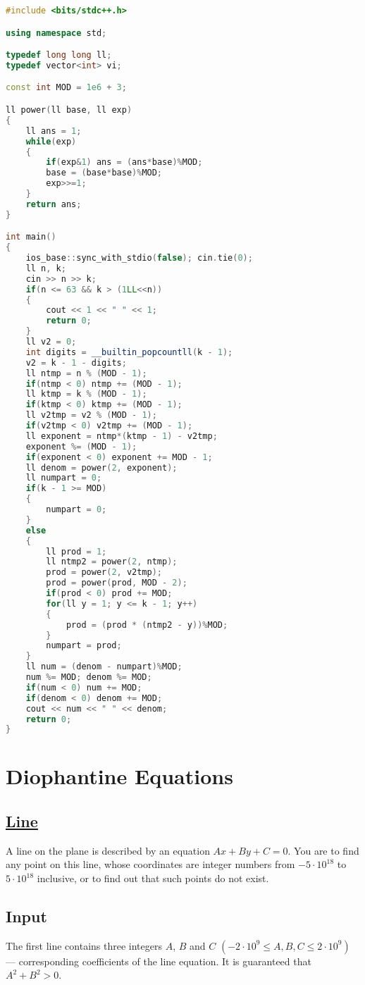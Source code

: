 \documentclass[10pt,a4paper]{article}
\begin{document}
\begin{lstlisting}[language=C++, caption={Zeus and The Birthday Paradox},label={1st:code}, mathescape=true, breaklines=true]
#include <bits/stdc++.h>

using namespace std;

typedef long long ll;
typedef vector<int> vi;

const int MOD = 1e6 + 3;

ll power(ll base, ll exp)
{
	ll ans = 1;
    while(exp)
    {
		if(exp&1) ans = (ans*base)%MOD;
		base = (base*base)%MOD;
		exp>>=1;
	}
    return ans;
}

int main()
{
	ios_base::sync_with_stdio(false); cin.tie(0);
	ll n, k;
	cin >> n >> k;
	if(n <= 63 && k > (1LL<<n))
	{
		cout << 1 << " " << 1;
		return 0;
	}
	ll v2 = 0;
	int digits = __builtin_popcountll(k - 1);
	v2 = k - 1 - digits;
	ll ntmp = n % (MOD - 1);
	if(ntmp < 0) ntmp += (MOD - 1);
	ll ktmp = k % (MOD - 1);
	if(ktmp < 0) ktmp += (MOD - 1);
	ll v2tmp = v2 % (MOD - 1);
	if(v2tmp < 0) v2tmp += (MOD - 1);
	ll exponent = ntmp*(ktmp - 1) - v2tmp;
	exponent %= (MOD - 1);
	if(exponent < 0) exponent += MOD - 1;
	ll denom = power(2, exponent);
	ll numpart = 0;
	if(k - 1 >= MOD)
	{
		numpart = 0;
	}
	else
	{
		ll prod = 1;
		ll ntmp2 = power(2, ntmp);
		prod = power(2, v2tmp);
		prod = power(prod, MOD - 2);
		if(prod < 0) prod += MOD;
		for(ll y = 1; y <= k - 1; y++)
		{
			prod = (prod * (ntmp2 - y))%MOD;
		}
		numpart = prod;
	}
	ll num = (denom - numpart)%MOD;
	num %= MOD; denom %= MOD;
	if(num < 0) num += MOD;
	if(denom < 0) denom += MOD;
	cout << num << " " << denom;
	return 0;
}
\end{lstlisting}


\section{Diophantine Equations}

\subsection*{\hyperlink{https://codeforces.com/problemset/problem/7/C}{\underline{Line}}} 
A line on the plane is described by an equation $Ax+By+C=0$. You are to find any point on this line, whose coordinates are integer numbers from $-5 \cdot 10^{18}$ to $5 \cdot 10^{18}$ inclusive, or to find out that such points do not exist.

\subsection*{Input}
The first line contains three integers $A$, $B$ and $C$ $(-2 \cdot 10^9 \leq A,B,C \leq 2 \cdot 10^9)$ — corresponding coefficients of the line equation. It is guaranteed that $A^2+B^2>0$.
\end{document}
